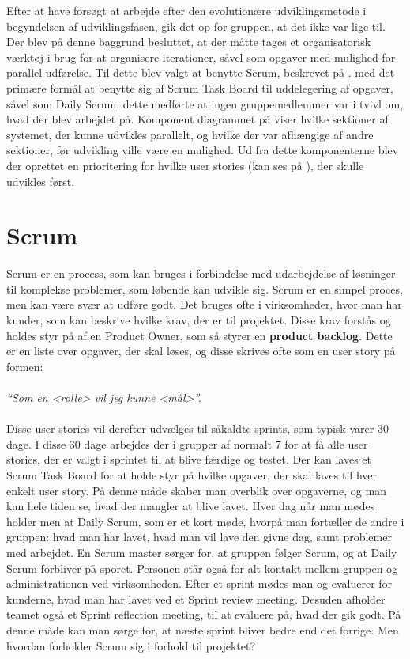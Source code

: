 Efter at have forsøgt at arbejde efter den evolutionære udviklingsmetode i begyndelsen af udviklingsfasen, gik det op for gruppen, at det ikke var lige til.
Der blev på denne baggrund besluttet, at der måtte tages et organisatorisk værktøj i brug for at organisere iterationer, såvel som opgaver med mulighed for parallel udførelse.
Til dette blev valgt at benytte Scrum, beskrevet på . med det primære formål at benytte sig af Scrum Task Board til uddelegering af opgaver, såvel som Daily Scrum; dette medførte at ingen gruppemedlemmer var i tvivl om, hvad der blev arbejdet på.
Komponent diagrammet på  viser hvilke sektioner af systemet, der kunne udvikles parallelt, og hvilke der var afhængige af andre sektioner, før udvikling ville være en mulighed.
Ud fra dette komponenterne blev der oprettet en prioritering for hvilke user stories (kan ses på ), der skulle udvikles først.

\section{Scrum}\label{scrum}
Scrum er en process, som kan bruges i forbindelse med udarbejdelse af løsninger til komplekse problemer, som løbende kan udvikle sig. 
Scrum er en simpel proces, men kan være svær at udføre godt.
Det bruges ofte i virksomheder, hvor man har kunder, som kan beskrive hvilke krav, der er til projektet.
Disse krav forstås og holdes styr på af en Product Owner, som så styrer en \textbf{product backlog}.
Dette er en liste over opgaver, der skal løses, og disse skrives ofte som en user story på formen:\\ \\ \textit{``Som en <rolle> vil jeg kunne <mål>''. }\\ \\
Disse user stories vil derefter udvælges til såkaldte sprints, som typisk varer 30 dage. 
I disse 30 dage arbejdes der i grupper af normalt 7 for at få alle user stories, der er valgt i sprintet til at blive færdige og testet.
Der kan laves et Scrum Task Board for at holde styr på hvilke opgaver, der skal laves til hver enkelt user story. 
På denne måde skaber man overblik over opgaverne, og man kan hele tiden se, hvad der mangler at blive lavet.
Hver dag når man mødes holder men at Daily Scrum, som er et kort møde, hvorpå man fortæller de andre i gruppen: hvad man har lavet, hvad man vil lave den givne dag, samt problemer med arbejdet.
En Scrum master sørger for, at gruppen følger Scrum, og at Daily Scrum forbliver på sporet. 
Personen står også for alt kontakt mellem gruppen og administrationen ved virksomheden.
Efter et sprint mødes man og evaluerer for kunderne, hvad man har lavet ved et Sprint review meeting.
Desuden afholder teamet også et Sprint reflection meeting, til at evaluere på, hvad der gik godt.
På denne måde kan man sørge for, at næste sprint bliver bedre end det forrige. \citep{A&I_DEV}
Men hvordan forholder Scrum sig i forhold til projektet?

